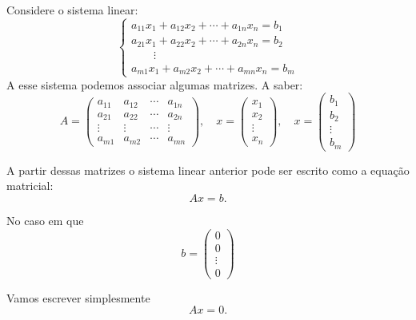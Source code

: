 \documentclass{beamer}
\begin{document}
    \begin{frame}
        Considere o sistema linear: 
        \begin{equation}
	    \begin{cases}
                a_{11}x_1 + a_{12}x_2 + \cdots + a_{1n}x_n = b_1\\
                a_{21}x_1 + a_{22}x_2 + \cdots + a_{2n}x_n = b_2\\
                \qquad \vdots\\
                a_{m1}x_1 + a_{m2}x_2 + \cdots + a_{mn}x_n = b_m
            \end{cases}
        \end{equation}
        A esse sistema podemos associar algumas matrizes. A saber:
        \[
            A = \begin{pmatrix}
                a_{11} & a_{12} & \cdots & a_{1n}\\
                a_{21} & a_{22} & \cdots & a_{2n}\\
                \vdots & \vdots & \cdots & \vdots\\
                a_{m1} & a_{m2} & \cdots & a_{mn}
            \end{pmatrix}, \quad
            x = \begin{pmatrix}
                x_1\\
                x_2\\
                \vdots\\
                x_n
            \end{pmatrix},\quad 
            x = \begin{pmatrix}
                b_1\\
                b_2\\
                \vdots\\
                b_m
            \end{pmatrix}
        \]
    \end{frame}
    
    \begin{frame}
        A partir dessas matrizes o sistema linear anterior pode ser escrito como a equação matricial:
        \[
            Ax = b.
        \]

        No caso em que
        \[
            b = \begin{pmatrix}
                0\\0\\\vdots\\0
            \end{pmatrix}
        \]

        Vamos escrever simplesmente
        \[
            Ax = 0.
        \]
    \end{frame}
\end{document}
